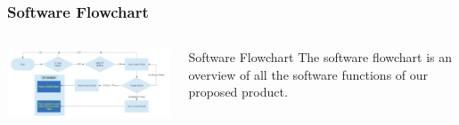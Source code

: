 \documentclass[aspectratio=169]{beamer}
\begin{document}
\begin{frame}
    \frametitle{Software Flowchart}

    \begin{columns}
        \begin{column}{0.72\textwidth}
            \includegraphics[width=11cm]{Operation}
        \end{column}

        \begin{column}{0.28\textwidth}
            \begin{block}{Software Flowchart}
                The software flowchart is an overview of all the software functions of our
                proposed product.
            \end{block}
        \end{column}
    \end{columns}


\end{frame}
\end{document}

